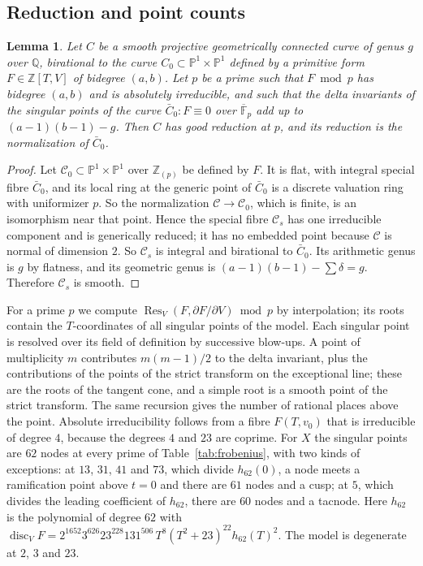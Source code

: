 \documentclass[11pt]{amsart}
\newtheorem{lemma}[theorem]{Lemma}
\theoremstyle{definition}
\newcommand{\QQ}{\mathbb{Q}}
\newcommand{\ZZ}{\mathbb{Z}}
\newcommand{\FF}{\mathbb{F}}
\newcommand{\PP}{\mathbb{P}}
\begin{document}
\subsection*{Reduction and point counts}
\begin{lemma}\label{lem:reduction}
Let $C$ be a smooth projective geometrically connected curve of genus $g$ over $\QQ$, birational to the curve $C_0\subset\PP^1\times\PP^1$ defined by a primitive form $F\in\ZZ[T,V]$ of bidegree $(a,b)$. Let $p$ be a prime such that $F\bmod p$ has bidegree $(a,b)$ and is absolutely irreducible, and such that the delta invariants of the singular points of the curve $\bar C_0\colon F\equiv0$ over $\overline{\FF}_p$ add up to $(a-1)(b-1)-g$. Then $C$ has good reduction at $p$, and its reduction is the normalization of $\bar C_0$.
\end{lemma}
\begin{proof}
Let $\mathcal C_0\subset\PP^1\times\PP^1$ over $\ZZ_{(p)}$ be defined by $F$. It is flat, with integral special fibre $\bar C_0$, and its local ring at the generic point of $\bar C_0$ is a discrete valuation ring with uniformizer $p$. So the normalization $\mathcal C\to\mathcal C_0$, which is finite, is an isomorphism near that point. Hence the special fibre $\mathcal C_s$ has one irreducible component and is generically reduced; it has no embedded point because $\mathcal C$ is normal of dimension $2$. So $\mathcal C_s$ is integral and birational to $\bar C_0$. Its arithmetic genus is $g$ by flatness, and its geometric genus is $(a-1)(b-1)-\sum\delta=g$. Therefore $\mathcal C_s$ is smooth.
\end{proof}

For a prime $p$ we compute $\operatorname{Res}_V(F,\partial F/\partial V)\bmod p$ by interpolation; its roots contain the $T$-coordinates of all singular points of the model. Each singular point is resolved over its field of definition by successive blow-ups. A point of multiplicity $m$ contributes $m(m-1)/2$ to the delta invariant, plus the contributions of the points of the strict transform on the exceptional line; these are the roots of the tangent cone, and a simple root is a smooth point of the strict transform. The same recursion gives the number of rational places above the point. Absolute irreducibility follows from a fibre $F(T,v_0)$ that is irreducible of degree $4$, because the degrees $4$ and $23$ are coprime. For $X$ the singular points are $62$ nodes at every prime of Table~\ref{tab:frobenius}, with two kinds of exceptions: at $13$, $31$, $41$ and $73$, which divide $h_{62}(0)$, a node meets a ramification point above $t=0$ and there are $61$ nodes and a cusp; at $5$, which divides the leading coefficient of $h_{62}$, there are $60$ nodes and a tacnode. Here $h_{62}$ is the polynomial of degree $62$ with $\operatorname{disc}_VF=2^{1652}3^{626}23^{228}131^{506}\,T^8(T^2+23)^{22}h_{62}(T)^2$. The model is degenerate at $2$, $3$ and $23$.
\end{document}
